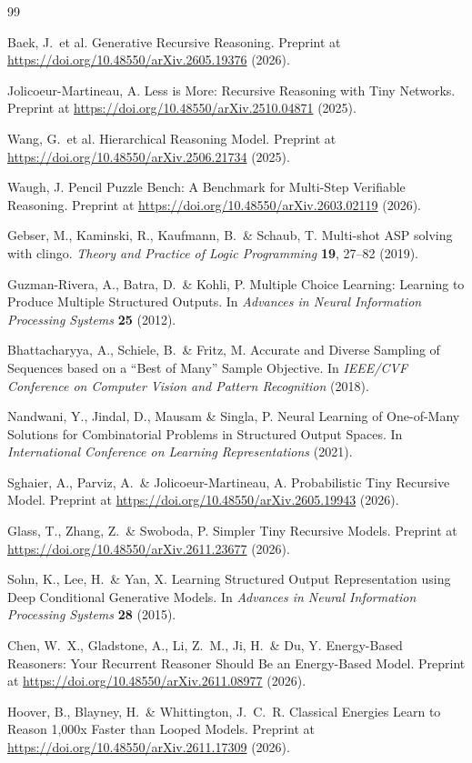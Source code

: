 \documentclass[11pt]{article}
\begin{document}
\begin{thebibliography}{99}

Baek, J.\ et al.
Generative Recursive Reasoning.
Preprint at \url{https://doi.org/10.48550/arXiv.2605.19376} (2026).

Jolicoeur-Martineau, A.
Less is More: Recursive Reasoning with Tiny Networks.
Preprint at \url{https://doi.org/10.48550/arXiv.2510.04871} (2025).

Wang, G.\ et al.
Hierarchical Reasoning Model.
Preprint at \url{https://doi.org/10.48550/arXiv.2506.21734} (2025).

Waugh, J.
Pencil Puzzle Bench: A Benchmark for Multi-Step Verifiable Reasoning.
Preprint at \url{https://doi.org/10.48550/arXiv.2603.02119} (2026).

Gebser, M., Kaminski, R., Kaufmann, B.\ \& Schaub, T.
Multi-shot ASP solving with clingo.
\emph{Theory and Practice of Logic Programming} \textbf{19}, 27--82 (2019).

Guzman-Rivera, A., Batra, D.\ \& Kohli, P.
Multiple Choice Learning: Learning to Produce Multiple Structured Outputs.
In \emph{Advances in Neural Information Processing Systems} \textbf{25} (2012).

Bhattacharyya, A., Schiele, B.\ \& Fritz, M.
Accurate and Diverse Sampling of Sequences based on a ``Best of Many'' Sample Objective.
In \emph{IEEE/CVF Conference on Computer Vision and Pattern Recognition} (2018).

Nandwani, Y., Jindal, D., Mausam \& Singla, P.
Neural Learning of One-of-Many Solutions for Combinatorial Problems in Structured Output Spaces.
In \emph{International Conference on Learning Representations} (2021).

Sghaier, A., Parviz, A.\ \& Jolicoeur-Martineau, A.
Probabilistic Tiny Recursive Model.
Preprint at \url{https://doi.org/10.48550/arXiv.2605.19943} (2026).

Glass, T., Zhang, Z.\ \& Swoboda, P.
Simpler Tiny Recursive Models.
Preprint at \url{https://doi.org/10.48550/arXiv.2611.23677} (2026).

Sohn, K., Lee, H.\ \& Yan, X.
Learning Structured Output Representation using Deep Conditional Generative Models.
In \emph{Advances in Neural Information Processing Systems} \textbf{28} (2015).

Chen, W.\ X., Gladstone, A., Li, Z.\ M., Ji, H.\ \& Du, Y.
Energy-Based Reasoners: Your Recurrent Reasoner Should Be an Energy-Based Model.
Preprint at \url{https://doi.org/10.48550/arXiv.2611.08977} (2026).

Hoover, B., Blayney, H.\ \& Whittington, J.\ C.\ R.
Classical Energies Learn to Reason 1,000x Faster than Looped Models.
Preprint at \url{https://doi.org/10.48550/arXiv.2611.17309} (2026).

\end{thebibliography}
\end{document}
